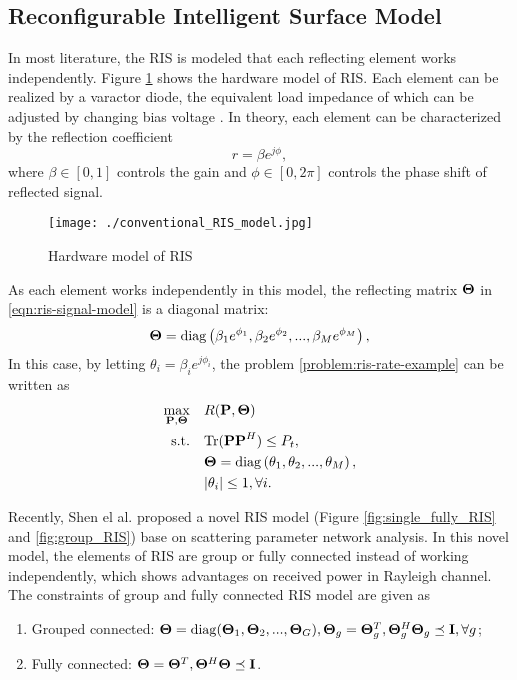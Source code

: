 \subsection{Reconfigurable Intelligent Surface Model}
In most literature, the RIS is modeled that each reflecting element works independently. Figure \ref{fig:conventional_RIS_model}
shows the hardware model of RIS. Each element can be realized by a varactor diode, the equivalent load impedance of which can be adjusted by changing bias voltage \cite{liu2020RIS}.
In theory, each element can be characterized by the reflection coefficient
\begin{equation}
    r = \beta e^{j \phi},
\end{equation} 
where $\beta \in [0,1]$ controls the gain and $\phi \in [0,2\pi]$ controls the phase shift of reflected signal.

\begin{figure}[htbp]
    \centering
    \texttt{[image: ./conventional\_RIS\_model.jpg]}
    \caption{Hardware model of RIS \cite{liu2020RIS}}
    \label{fig:conventional_RIS_model}
\end{figure}

As each element works independently in this model, the reflecting matrix ${\bf \Theta}$ in \eqref{eqn:ris-signal-model} is a diagonal matrix:
\begin{equation}
    {\bf \Theta} = \mathrm{diag}\left( \beta_1 e^{\phi_1},\beta_2 e^{\phi_2},...,\beta_M e^{\phi_M} \right),
\end{equation}
In this case, by letting $\theta_i = \beta_i e^{j\phi_i}$, the problem \eqref{problem:ris-rate-example} can be written as
\begin{subequations}
    \begin{align}
      \max_{{\bf P, \Theta}} \quad &R({\bf P, \Theta}) \\
      \mathrm{s.t.} \quad & \mathrm{Tr}({\bf PP}^H) \leq P_t, \\ 
      & {\bf \Theta} = \mathrm{diag}\left( \theta_1,\theta_2,...,\theta_M \right),\\
      & |\theta_i| \leq 1, \forall i.
    \end{align}
\end{subequations}

Recently, Shen el al. \cite{shen2020modeling} proposed a novel RIS model (Figure \ref{fig:single_fully_RIS} and \ref{fig:group_RIS}) base on scattering parameter network analysis. In this
novel model, the elements of RIS are group or fully connected instead of working independently, which shows advantages 
on received power in Rayleigh channel. The constraints of group and fully connected RIS model are given as
\begin{enumerate}
    \item Grouped connected: ${\bf \Theta} = \mathrm{diag}({\bf \Theta}_1,{\bf \Theta}_2,...,{\bf \Theta}_G), {\bf \Theta}_g={\bf \Theta}_g^T,{\bf \Theta}_g^H {\bf \Theta}_g \preceq {\bf I},\forall g$;
    \item Fully connected: ${\bf \Theta} = {\bf \Theta}^T, {\bf \Theta}^H {\bf \Theta} \preceq {\bf I}$.
\end{enumerate}

